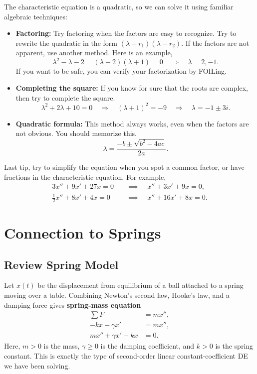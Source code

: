 \documentclass[10pt,letterpaper]{article}
\begin{document}
The characteristic equation is a quadratic, so we can solve it using familiar algebraic techniques:
\begin{itemize}
\item \textbf{Factoring:} Try factoring when the factors are
easy to recognize. Try to rewrite the quadratic in the form
$(\lambda-r_1)(\lambda-r_2)$. If the factors are not apparent,
use another method. Here is an example,
    \[
    \lambda^2-\lambda-2
    =(\lambda-2)(\lambda+1)=0
    \quad\Rightarrow\quad \lambda=2,-1.
    \]
    If you want to be safe, you can verify your factorization by FOILing.
    
    \item \textbf{Completing the square:} If you know for sure that the roots are complex, then try to complete the square.
    \[
    \lambda^2+2\lambda+10=0
    \quad\Rightarrow\quad
    (\lambda+1)^2=-9
    \quad\Rightarrow\quad \lambda=-1\pm3i.
    \]

    \item \textbf{Quadratic formula:} This method always works, even when
    the factors are not obvious. You should memorize this. 
    \[
    \lambda=\frac{-b\pm\sqrt{b^2-4ac}}{2a}.
    \]
\end{itemize}
Last tip, try to simplify the equation when you spot a common factor, or have fractions in the characteristic equation. For example,
\begin{align*}
3x''+9x'+27x=0
&\quad\implies\quad x''+3x'+9x=0,\\
\tfrac12 x''+8x'+4x=0
&\quad\implies\quad x''+16x'+8x=0.
\end{align*}

\section{Connection to Springs}

\subsection{Review Spring Model}

Let $x(t)$ be the displacement from equilibrium of a ball attached
to a spring moving over a table. Combining Newton's second law,
Hooke's law, and a damping force gives \textbf{spring-mass equation}
\begin{align*}
\sum F&=mx'',\\
-kx-\gamma x'&=mx'',\\
mx''+\gamma x'+kx&=0.
\end{align*}
Here, $m>0$ is the mass, $\gamma\ge0$ is the damping coefficient,
and $k>0$ is the spring constant. This is exactly the type of
second-order linear constant-coefficient DE we have been solving.
\end{document}

